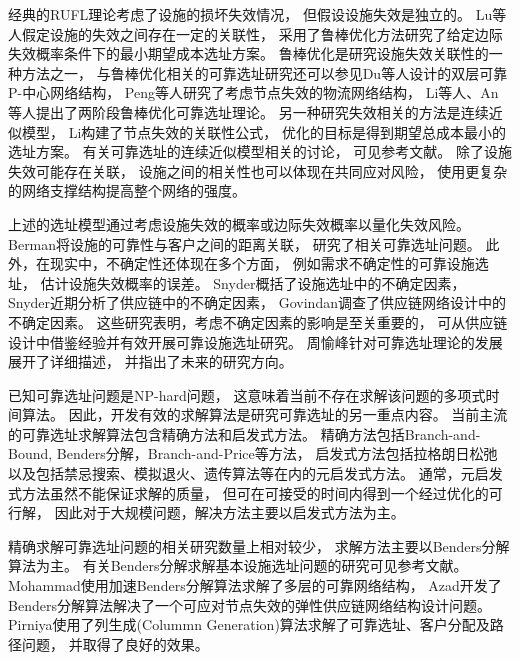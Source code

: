经典的RUFL理论考虑了设施的损坏失效情况，
但假设设施失效是独立的。
Lu等人\cite{lu_correlated}假定设施的失效之间存在一定的关联性，
采用了鲁棒优化方法研究了给定边际失效概率条件下的最小期望成本选址方案。
鲁棒优化是研究设施失效关联性的一种方法之一，
与鲁棒优化相关的可靠选址研究还可以参见Du等人\cite{Du}设计的双层可靠P-中心网络结构，
Peng等人\cite{peng}研究了考虑节点失效的物流网络结构，
Li等人\cite{Yongzhen}、An等人\cite{an2014reliable}提出了两阶段鲁棒优化可靠选址理论。
另一种研究失效相关的方法是连续近似模型，
Li\cite{Lixiapeng2010}构建了节点失效的关联性公式，
优化的目标是得到期望总成本最小的选址方案。
有关可靠选址的连续近似模型相关的讨论，
可见参考文献\cite{yun2019,fan,Cui2010}。
除了设施失效可能存在关联，
设施之间的相关性也可以体现在共同应对风险\cite{jiang}，
使用更复杂的网络支撑结构提高整个网络的强度\cite{LiXP2013}。

上述的选址模型通过考虑设施失效的概率或边际失效概率以量化失效风险。
Berman\cite{BermanDist}将设施的可靠性与客户之间的距离关联，
研究了相关可靠选址问题。
此外，在现实中，不确定性还体现在多个方面，
例如需求不确定性的可靠设施选址\cite{cheng}，
估计设施失效概率的误差\cite{lim2013facility}。
Snyder\cite{Snyder2006综述}概括了设施选址中的不确定因素，
Snyder\cite{SnyderReview}近期分析了供应链中的不确定因素，
Govindan\cite{Govindan}调查了供应链网络设计中的不确定因素。
这些研究表明，考虑不确定因素的影响是至关重要的，
可从供应链设计中借鉴经验并有效开展可靠设施选址研究。
周愉峰\cite{周愉峰综述}针对可靠选址理论的发展展开了详细描述，
并指出了未来的研究方向。

已知可靠选址问题是NP-hard问题\cite{Snyder2005}，
这意味着当前不存在求解该问题的多项式时间算法。
因此，开发有效的求解算法是研究可靠选址的另一重点内容。
当前主流的可靠选址求解算法包含精确方法和启发式方法。
精确方法包括Branch-and-Bound, Benders分解，Branch-and-Price等方法，
启发式方法包括拉格朗日松弛
以及包括禁忌搜索、模拟退火、遗传算法等在内的元启发式方法。
通常，元启发式方法虽然不能保证求解的质量，
但可在可接受的时间内得到一个经过优化的可行解，
因此对于大规模问题，解决方法主要以启发式方法为主。

精确求解可靠选址问题的相关研究数量上相对较少，
求解方法主要以Benders分解算法为主。
有关Benders分解求解基本设施选址问题的研究可见参考文献\cite{fischetti,ortiz2019exact,wentges1996accelerating}。
Mohammad\cite{MohammadBenders}使用加速Benders分解算法求解了多层的可靠网络结构，
Azad\cite{Azad}开发了Benders分解算法解决了一个可应对节点失效的弹性供应链网络结构设计问题。
Pirniya\cite{Pirniya}使用了列生成(Colummn Generation)算法求解了可靠选址、客户分配及路径问题，
并取得了良好的效果。

